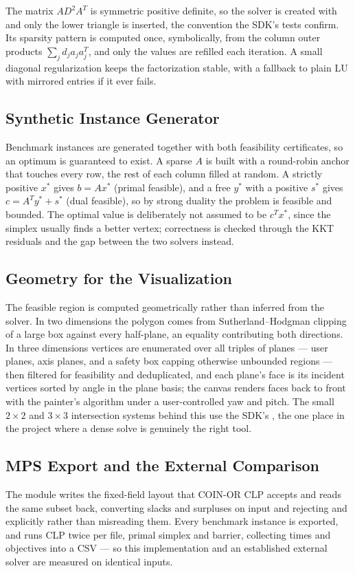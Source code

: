 \documentclass[12pt, a4paper]{article}
\begin{document}
The matrix $A D^{2} A^{T}$ is symmetric positive definite, so the solver is created with  and only the lower triangle is inserted, the convention the SDK's tests confirm. Its sparsity pattern is computed once, symbolically, from the column outer products $\sum_j d_j a_j a_j^{T}$, and only the values are refilled each iteration. A small diagonal regularization keeps the factorization stable, with a fallback to plain LU with mirrored entries if it ever fails.

\subsection{Synthetic Instance Generator}
Benchmark instances are generated together with both feasibility certificates, so an optimum is guaranteed to exist. A sparse $A$ is built with a round-robin anchor that touches every row, the rest of each column filled at random. A strictly positive $x^{*}$ gives $b = Ax^{*}$ (primal feasible), and a free $y^{*}$ with a positive $s^{*}$ gives $c = A^{T}y^{*} + s^{*}$ (dual feasible), so by strong duality the problem is feasible and bounded. The optimal value is deliberately not assumed to be $c^{T}x^{*}$, since the simplex usually finds a better vertex; correctness is checked through the KKT residuals and the gap between the two solvers instead.

\subsection{Geometry for the Visualization}
The feasible region is computed geometrically rather than inferred from the solver. In two dimensions the polygon comes from Sutherland--Hodgman clipping of a large box against every half-plane, an equality contributing both directions. In three dimensions vertices are enumerated over all triples of planes --- user planes, axis planes, and a safety box capping otherwise unbounded regions --- then filtered for feasibility and deduplicated, and each plane's face is its incident vertices sorted by angle in the plane basis; the canvas renders faces back to front with the painter's algorithm under a user-controlled yaw and pitch. The small $2 \times 2$ and $3 \times 3$ intersection systems behind this use the SDK's , the one place in the project where a dense solve is genuinely the right tool.

\subsection{MPS Export and the External Comparison}
The module  writes the fixed-field  layout that COIN-OR CLP accepts and reads the same subset back, converting slacks and surpluses on input and rejecting  and  explicitly rather than misreading them. Every benchmark instance is exported, and  runs CLP twice per file, primal simplex and barrier, collecting times and objectives into a CSV --- so this implementation and an established external solver are measured on identical inputs.
\end{document}
